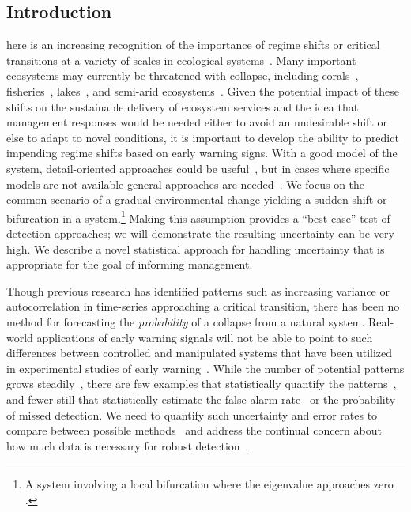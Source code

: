 \documentclass{pnastwo}
\begin{document}
\begin{article}
                             \section{Introduction}
here is an increasing recognition of the importance of regime shifts or critical transitions at a variety of scales in ecological systems~\cite{Holling1973, Wissel1984, Scheffer2001, Scheffer2009, Drake2010, Carpenter2011}⁠. 
Many important ecosystems may currently be threatened with collapse, including corals~\cite{Bellwood2004}, fisheries~\cite{Berkes2006}⁠, lakes~\cite{Carpenter2011}, and semi-arid ecosystems~\cite{Kefi2007}⁠. 
Given the potential impact of  these shifts on the sustainable delivery of ecosystem services
and the idea that management responses would be needed either to avoid an undesirable shift or else to adapt to novel conditions,
it is important to develop the ability to predict impending regime shifts based on early warning signs. 
With a good model of the system, detail-oriented approaches could be useful~\cite{Lenton2009},
but in cases where specific models are not available general approaches are needed~\cite{Scheffer2009}⁠.
We focus on the common scenario of a gradual environmental change yielding a sudden shift or bifurcation in a system.\footnote{A system involving a local bifurcation where the eigenvalue approaches zero \cite{Scheffer2001, Scheffer2009}.}  
Making this assumption provides a ``best-case'' test of detection approaches;
we will demonstrate the resulting uncertainty can be very high.
We describe a novel statistical approach for handling uncertainty that is appropriate for the goal of informing management.  

Though previous research has identified patterns such as increasing variance or autocorrelation
in time-series approaching a critical transition,
there has been no method for forecasting the \emph{probability} of a collapse from a natural system.
Real-world applications of early warning signals will not be able to point to such differences between controlled and
manipulated systems that have been utilized in experimental studies of early warning~\cite{Drake2010, Carpenter2011}⁠.
While the number of potential patterns grows steadily~\cite{Carpenter2006, Dakos2008, Guttal2008, Guttal2008a, Dakos2011}, %
there are few examples that statistically quantify the patterns~\cite{Dakos2008, Dakos2011},⁠
and fewer still that statistically estimate the false alarm rate~\cite{Dakos2008} or 
the probability of missed detection⁠. 
We need to quantify such uncertainty and error rates to compare between possible methods~\cite{Contamin2009}
and address the continual concern about how much data is necessary⁠ for robust detection~\cite{Scheffer2001, Dakos2008, Carpenter2011, Scheffer2010, Inman2011}.  


\end{article}
\end{document}
